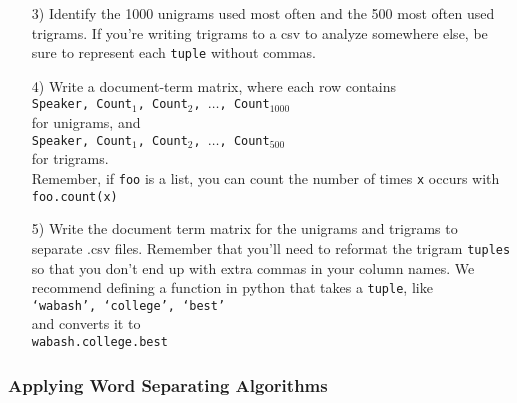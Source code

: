 \documentclass[12pt,letterpaper]{article}
\begin{document}
\begin{itemize}
\item[3)] Identify the 1000 unigrams used most often and the 500 most often used trigrams.  If you're writing trigrams to a csv to analyze somewhere else, be sure to represent each {\tt tuple} without commas.  
\item[4)] Write a document-term matrix, where each row contains \\
{\tt Speaker, Count$_1$, Count$_2$, $\hdots$, Count$_{1000}$ }\\
for unigrams, and \\
{\tt Speaker, Count$_1$, Count$_2$, $\hdots$, Count$_{500}$ }\\
for trigrams. \\

Remember, if {\tt foo} is a list, you can count the number of times {\tt x} occurs with \\
{\tt foo.count(x)}

\item[5)] Write the document term matrix for the unigrams and trigrams to separate .csv files.  Remember that you'll need to reformat the trigram {\tt tuples} so that you don't end up with extra commas in your column names. We recommend defining a function in python that takes a {\tt tuple}, like \\
{\tt `wabash', `college', `best'} \\
and converts it to\\
{\tt wabash.college.best}
\end{itemize}

\subsubsection*{Applying Word Separating Algorithms}
\end{document}

